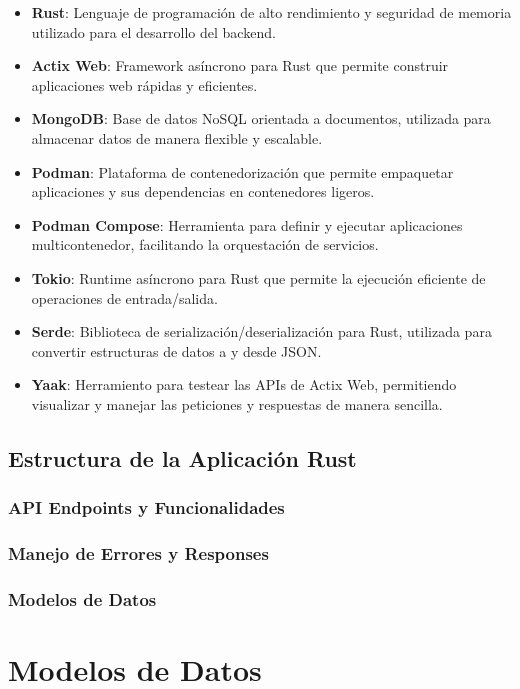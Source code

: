 \documentclass[12pt,letterpaper]{article}
\begin{document}
\begin{itemize}
    \item \textbf{Rust}: Lenguaje de programación de alto rendimiento y seguridad de memoria utilizado para el desarrollo del backend.
    \item \textbf{Actix Web}: Framework asíncrono para Rust que permite construir aplicaciones web rápidas y eficientes.
    \item \textbf{MongoDB}: Base de datos NoSQL orientada a documentos, utilizada para almacenar datos de manera flexible y escalable.
    \item \textbf{Podman}: Plataforma de contenedorización que permite empaquetar aplicaciones y sus dependencias en contenedores ligeros.
    \item \textbf{Podman Compose}: Herramienta para definir y ejecutar aplicaciones multicontenedor, facilitando la orquestación de servicios.
    \item \textbf{Tokio}: Runtime asíncrono para Rust que permite la ejecución eficiente de operaciones de entrada/salida.
    \item \textbf{Serde}: Biblioteca de serialización/deserialización para Rust, utilizada para convertir estructuras de datos a y desde JSON.
    \item \textbf{Yaak}: Herramiento para testear las APIs de Actix Web, permitiendo visualizar y manejar las peticiones y respuestas de manera sencilla.

\end{itemize}

\subsection{Estructura de la Aplicación Rust}
\subsubsection{API Endpoints y Funcionalidades}
\subsubsection{Manejo de Errores y Responses}
\subsubsection{Modelos de Datos}

\section{Modelos de Datos}
\end{document}
